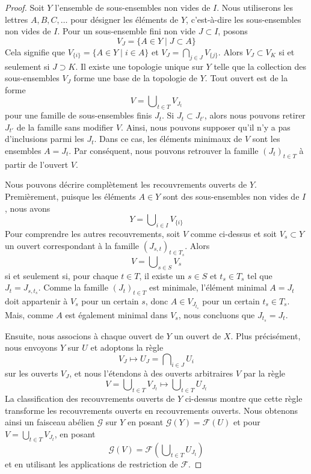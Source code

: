 \begin{proof}

Soit $Y$ l'ensemble de sous-ensembles non vides de $I$. Nous utiliserons les lettres
$A, B, C, \ldots$ pour désigner les éléments de $Y$, c'est-à-dire les sous-ensembles non vides de $I$. Pour un sous-ensemble fini non vide $J \subset I$, posons
$$
V_J = \{A \in Y \mid J \subset A\}
$$
Cela signifie que $V_{\{i\}} = \{A \in Y \mid i \in A\}$ et
$V_J = \bigcap_{j \in J} V_{\{j\}}$. Alors $V_J \subset V_K$ si et seulement si $J \supset K$. Il existe une topologie unique sur $Y$ telle que la collection des sous-ensembles $V_J$ forme une base de la topologie de $Y$. Tout ouvert est de la forme
$$
V = \bigcup\nolimits_{t \in T} V_{J_t}
$$
pour une famille de sous-ensembles finis $J_t$. Si $J_t \subset J_{t'}$,
alors nous pouvons retirer $J_{t'}$ de la famille sans modifier $V$. Ainsi, nous pouvons supposer qu'il n'y a pas d'inclusions parmi les $J_t$. Dans ce cas, les éléments minimaux de $V$ sont les ensembles $A = J_t$. Par conséquent, nous pouvons retrouver la famille $(J_t)_{t \in T}$ à partir de l'ouvert $V$.

\medskip\noindent

Nous pouvons décrire complètement les recouvrements ouverts de $Y$. Premièrement, puisque les éléments $A \in Y$ sont des sous-ensembles non vides de $I$, nous avons
$$
Y = \bigcup\nolimits_{i \in I} V_{\{i\}}
$$
Pour comprendre les autres recouvrements, soit $V$ comme ci-dessus et soit $V_s \subset Y$
un ouvert correspondant à la famille $(J_{s, t})_{t \in T_s}$. Alors
$$
V = \bigcup\nolimits_{s \in S} V_s
$$
si et seulement si, pour chaque $t \in T$, il existe un $s \in S$ et
$t_s \in T_s$ tel que $J_t = J_{s, t_s}$. Comme la famille
$(J_t)_{t \in T}$ est minimale, l'élément minimal $A = J_t$
doit appartenir à $V_s$ pour un certain $s$, donc $A \in V_{J_{t_s}}$ pour un certain
$t_s \in T_s$. Mais, comme $A$ est également minimal dans $V_s$, nous concluons que $J_{t_s} = J_t$.

\medskip\noindent

Ensuite, nous associons à chaque ouvert de $Y$ un ouvert de $X$. Plus précisément, nous envoyons
$Y$ sur $U$ et adoptons la règle
$$
V_J \mapsto U_J = \bigcap\nolimits_{i \in J} U_i
$$
sur les ouverts $V_J$, et nous l'étendons à des ouverts arbitraires $V$ par la règle
$$
V = \bigcup\nolimits_{t \in T} V_{J_t}
\mapsto
\bigcup\nolimits_{t \in T} U_{J_t}
$$
La classification des recouvrements ouverts de $Y$ ci-dessus montre que cette règle transforme les recouvrements ouverts en recouvrements ouverts. Nous obtenons ainsi un faisceau abélien $\mathcal{G}$ sur $Y$ en posant
$\mathcal{G}(Y) = \mathcal{F}(U)$ et pour
$V = \bigcup\nolimits_{t \in T} V_{J_t}$, en posant
$$
\mathcal{G}(V) = \mathcal{F}\left(\bigcup\nolimits_{t \in T} U_{J_t}\right)
$$
et en utilisant les applications de restriction de $\mathcal{F}$.


\end{proof}
